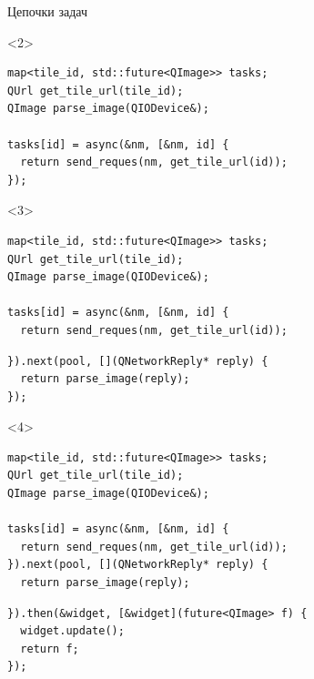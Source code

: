 \documentclass[aspectratio=169,hyperref={unicode},17pt]{beamer}
\begin{document}
\begin{frame}[fragile,t]{Цепочки задач}
\begin{onlyenv}<2>
\begin{lstlisting}[style=cppcode,aboveskip=0pt,belowskip=0pt]
map<tile_id, std::future<QImage>> tasks;
QUrl get_tile_url(tile_id);
QImage parse_image(QIODevice&);

tasks[id] = async(&nm, [&nm, id] {
  return send_reques(nm, get_tile_url(id));
});
\end{lstlisting}
\end{onlyenv}
\begin{onlyenv}<3>
\begin{lstlisting}[style=cppcode,aboveskip=0pt,belowskip=0pt]
map<tile_id, std::future<QImage>> tasks;
QUrl get_tile_url(tile_id);
QImage parse_image(QIODevice&);

tasks[id] = async(&nm, [&nm, id] {
  return send_reques(nm, get_tile_url(id));
\end{lstlisting}
\begin{lstlisting}[style=cppcode,backgroundcolor=\color{gray!30},aboveskip=0pt,belowskip=0pt]
}).next(pool, [](QNetworkReply* reply) {
  return parse_image(reply);
});
\end{lstlisting}
\end{onlyenv}
\begin{onlyenv}<4>
\begin{lstlisting}[style=cppcode,aboveskip=0pt,belowskip=0pt]
map<tile_id, std::future<QImage>> tasks;
QUrl get_tile_url(tile_id);
QImage parse_image(QIODevice&);

tasks[id] = async(&nm, [&nm, id] {
  return send_reques(nm, get_tile_url(id));
}).next(pool, [](QNetworkReply* reply) {
  return parse_image(reply);
\end{lstlisting}
\begin{lstlisting}[style=cppcode,backgroundcolor=\color{gray!30},aboveskip=0pt,belowskip=0pt]
}).then(&widget, [&widget](future<QImage> f) {
  widget.update();
  return f;
});
\end{lstlisting}
\end{onlyenv}
\end{frame}
\end{document}
